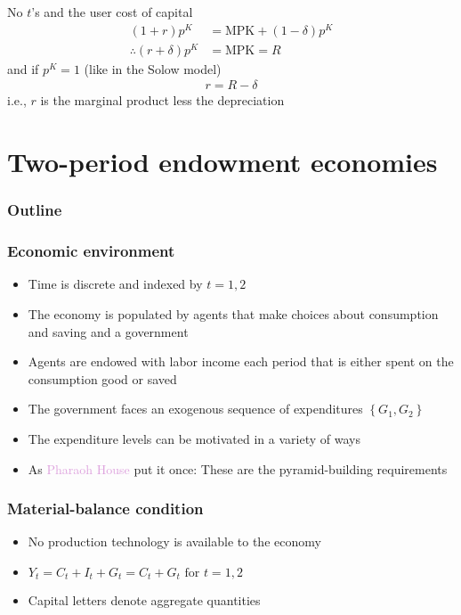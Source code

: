 \documentclass[presentation,dvipsnames]{beamer}
\begin{document}
\begin{frame}[label=sec-2-9]{No $t$'s and the user cost of capital}
\begin{align*}
(1+r)p^{K} &= \text{MPK} + (1-\delta)p^{K} \\
\therefore (r+\delta) p^{K} &= \text{MPK} = R
\end{align*}
and if $p^{K} = 1$ (like in the Solow model)
\begin{align*}
r = R - \delta
\end{align*}
i.e., $r$ is the marginal product less the depreciation
\end{frame}

\section{Two-period endowment economies}

\begin{frame}
\frametitle{Outline}
\tableofcontents[currentsection]
\end{frame}

\begin{frame}
\frametitle{Economic environment}
\begin{itemize}[label={--}]
\item Time is discrete and indexed by $t=1,2$
\item The economy is populated by agents that make choices about consumption and saving and a government
\item Agents are endowed with labor income each period that is either spent on the consumption good or saved
\item The government faces an exogenous sequence of expenditures $\left\{ G_{1},G_{2} \right\}$
\item The expenditure levels can be motivated in a variety of ways
\item As \textcolor{Plum}{Pharaoh House} put it once: These are the pyramid-building requirements
\end{itemize}
\end{frame}

\begin{frame}
\frametitle{Material-balance condition}
\begin{itemize}[label={--}]
\item No production technology is available to the economy
\item $Y_{t} = C_{t} + I_{t} + G_{t} = C_{t} + G_{t} \text{ for } t=1,2$
\item Capital letters denote aggregate quantities
\end{itemize}
\end{frame}
\end{document}
